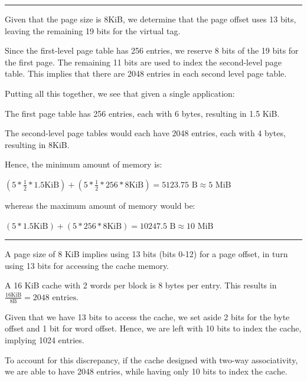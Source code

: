 \documentclass[11pt]{exam}
\newcounter{questionCounter}
\newcounter{partCounter}[questionCounter]
\newenvironment{namedquestion}[1]{%
    \addtocounter{questionCounter}{1}%
    \setcounter{partCounter}{0}%
    \vspace{.2in}%
        \noindent{\bf #1}%
    \vspace{0.3em} \hrule \vspace{.1in}%
}{}
\begin{document}
\begin{namedquestion}{Question 5.11.5}

Given that the page size is 8KiB, we determine that the page offset uses 13 bits, leaving the remaining 19 bits for the virtual tag.

Since the first-level page table has 256 entries, we reserve 8 bits of the 19 bits for the first page. The remaining 11 bits are used to index the second-level page table. This implies that there are 2048 entries in each second level page table. 

Putting all this together, we see that given a single application:

The first page table has 256 entries, each with 6 bytes, resulting in 1.5 KiB.

The second-level page tables would each have 2048 entries, each with 4 bytes, resulting in 8KiB.

Hence, the minimum amount of memory is:

$(5*\frac{1}{2}*1.5 \text{KiB}) + (5*\frac{1}{2}*256*8\text{KiB}) = 5123.75 \text{ B} \approx5 \text{ MiB}$ 

whereas the maximum amount of memory would be: 

$(5*1.5 \text{KiB}) + (5*256*8\text{KiB}) = 10247.5 \text{ B} \approx10 \text{ MiB}$ 

\end{namedquestion}

\begin{namedquestion}{Question 5.11.6}

A page size of 8 KiB implies using 13 bits (bits 0-12) for a page offset, in turn using 13 bits for accessing the cache memory.

A 16 KiB cache with 2 words per block is 8 bytes per entry. This results in $\frac{16 \text{KiB}}{8 \text{B}} = 2048 \text{ entries}$.

Given that we have 13 bits to access the cache, we set aside 2 bits for the byte offset and 1 bit for word offset. Hence, we are left with 10 bits to index the cache, implying 1024 entries. 

To account for this discrepancy, if the cache designed with two-way associativity, we are able to have 2048 entries, while having only 10 bits to index the cache.

\end{namedquestion}









\printbibliography
\end{document}
